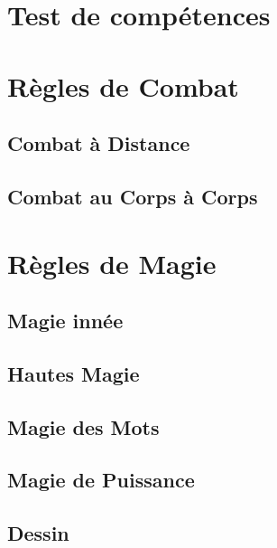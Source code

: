 \section{Test de compétences}
\section{Règles de Combat}
\subsection{Combat à Distance}
\subsection{Combat au Corps à Corps}
\section{Règles de Magie}
\subsection{Magie innée}
\subsection{Hautes Magie}
\subsection{Magie des Mots}
\subsection{Magie de Puissance}
\subsection{Dessin}